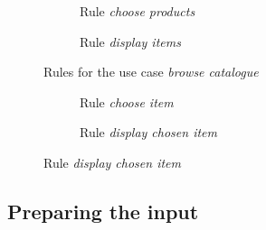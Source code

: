\begin{example}
\begin{figure}[!ht]
\begin{subfigure}[t]{.5\textwidth}
    \caption{Rule \emph{choose products}}
  \end{subfigure}
  \begin{subfigure}[t]{.5\textwidth}
    \centerline{}
    \caption{Rule \emph{display items}}
  \end{subfigure}
  \caption{Rules for the use case \emph{browse catalogue}}\label{fig:tests:grammar}
\end{figure}

\begin{figure}[!ht]
\ContinuedFloat
\centering
  \begin{subfigure}[t]{.5\textwidth}
    \centerline{}
    \caption{Rule \emph{choose item}}
  \end{subfigure}

  \begin{subfigure}[t]{.5\textwidth}
    \centerline{}
    \caption{Rule \emph{display chosen item}}
  \end{subfigure}
\end{figure}
\end{example}
\subsection{Preparing the input}

